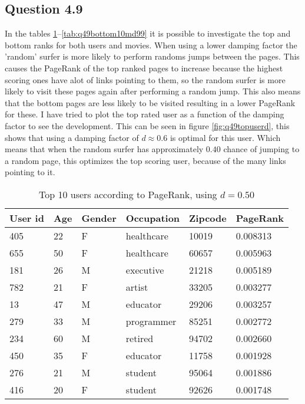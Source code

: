 \subsection*{Question 4.9}

In the tables \ref{tab:q49top10ud50}--\ref{tab:q49bottom10md99} it is
possible to investigate the top and bottom ranks for both users and
movies. When using a lower damping factor the 'random' surfer is more
likely to perform randoms jumps between the pages. This causes the
PageRank of the top ranked pages to increase because the highest
scoring ones have alot of links pointing to them, so the random surfer
is more likely to visit these pages again after performing a random
jump. This also means that the bottom pages are less likely to be
visited resulting in a lower PageRank for these. I have tried to plot
the top rated user as a function of the damping factor to see the
development. This can be seen in figure \ref{fig:q49topuserd}, this
shows that using a damping factor of $d \approx 0.6$ is optimal for
this user. Which means that when the random surfer has approximately
$0.40$ chance of jumping to a random page, this optimizes the top
scoring user, because of the many links pointing to it.

\begin{table}[!htbp]
\centering
\begin{tabular}{llllll}
User id & Age & Gender & Occupation & Zipcode & PageRank \\
\hline
405 & 22 & F & healthcare & 10019 & 0.008313 \\
655 & 50 & F & healthcare & 60657 & 0.005963 \\
181 & 26 & M & executive & 21218 & 0.005189 \\
782 & 21 & F & artist & 33205 & 0.003277 \\
13 & 47 & M & educator & 29206 & 0.003257 \\
279 & 33 & M & programmer & 85251 & 0.002772 \\
234 & 60 & M & retired & 94702 & 0.002660 \\
450 & 35 & F & educator & 11758 & 0.001928 \\
276 & 21 & M & student & 95064 & 0.001886 \\
416 & 20 & F & student & 92626 & 0.001748 \\
\end{tabular}
\caption{Top 10 users according to PageRank, using $d = 0.50$}
\label{tab:q49top10ud50}
\end{table}

